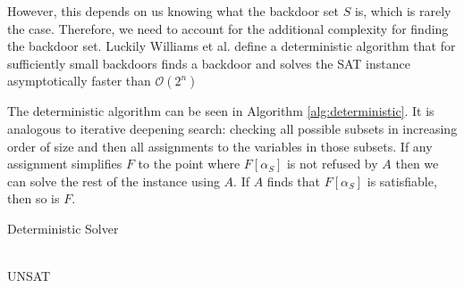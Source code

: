 However, this depends on us knowing what the backdoor set $S$ is, which is rarely
the case. Therefore, we need to account for the additional complexity for
finding the backdoor set. Luckily Williams et al. define a deterministic algorithm
that for sufficiently small backdoors finds a backdoor and solves the SAT instance
asymptotically faster than $\mathcal{O}(2^{n})$

The deterministic algorithm can be seen in Algorithm \ref{alg:deterministic}. It
is analogous to iterative deepening search: checking all possible subsets in increasing
order of size and then all assignments to the variables in those subsets. If any
assignment simplifies $F$ to the point where $F[\alpha_S]$ is not refused by $A$ then
we can solve the rest of the instance using $A$. If $A$ finds that $F[\alpha_S]$
is satisfiable, then so is $F$.

\begin{algorithm}
\caption{Deterministic Solver}
\label{alg:deterministic}
\vspace{5pt}
\hrulefill\\

\nl {}
\nl \Return{} UNSAT

\end{algorithm}

